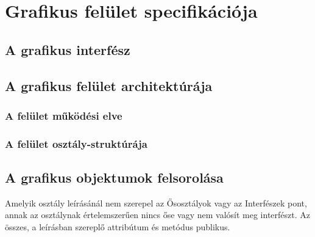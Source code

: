 


\setcounter{section}{10}




\fedlap

\section{Grafikus felület specifikációja}

\subsection{A grafikus interfész}

\subsection{A grafikus felület architektúrája}

\subsubsection{A felület működési elve}

\subsubsection{A felület osztály-struktúrája}

\subsection{A grafikus objektumok felsorolása}
Amelyik osztály leírásánál nem szerepel az Ősosztályok vagy az Interfészek pont, annak az osztálynak értelemszerűen nincs őse vagy nem valósít meg interfészt. Az összes, a leírásban szereplő attribútum és metódus publikus.

